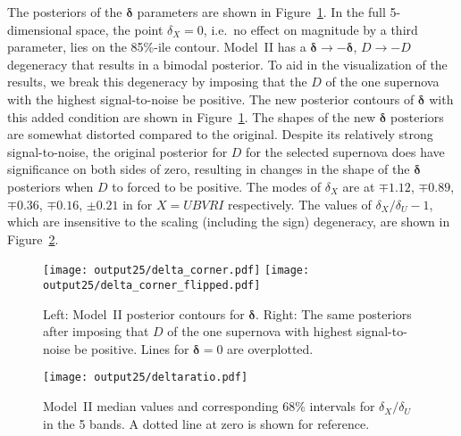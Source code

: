 \documentclass{aastex61}   	%
\begin{document}
\color{red}

The posteriors of the $\pmb{\delta}$ parameters are shown  in
Figure~\ref{deltacorner:fig}.
In the full 5-dimensional space,
the point $\delta_X=0$, i.e.\ no effect on magnitude by a third parameter,  lies on the 85\%-ile contour.
Model~II has a  $\pmb{\delta} \rightarrow -\pmb{\delta}$, $D \rightarrow -D$ degeneracy that results in a bimodal posterior.
To aid in the visualization of the results,
we break this degeneracy by imposing  that the $D$ of the one supernova with the highest signal-to-noise be positive.
The new posterior contours of $\pmb{\delta}$ with this added
condition are shown in Figure~\ref{deltacorner:fig}.
The shapes of the new $\pmb{\delta}$ posteriors are somewhat distorted compared to the original.
Despite its relatively strong signal-to-noise, the original posterior for $D$ for the selected supernova does have significance on both sides of zero,
resulting in changes in the shape of the $\pmb{\delta}$ posteriors when  $D$ to forced to be positive.   
The modes of $\delta_X$ are at $\mp 1.12$, $\mp 0.89$, $\mp 0.36$,  $\mp0.16$, $\pm0.21$ in for $X=UBVRI$ respectively.
The values of $\delta_X/\delta_U-1$, which are insensitive to the scaling (including the sign) degeneracy, are shown in Figure~\ref{deltaratio:fig}.

\begin{figure}[htbp] %
   \centering
   \texttt{[image: output25/delta\_corner.pdf]}
     \texttt{[image: output25/delta\_corner\_flipped.pdf]}
   \caption{Left:  Model~II posterior contours for $\pmb{\delta}$.
   Right: The same posteriors after imposing that $D$ of the one supernova with highest signal-to-noise be positive.
     Lines for $\pmb{\delta}=0$ are overplotted.
   \label{deltacorner:fig}}
\end{figure}


\begin{figure}[htbp] %
   \centering
      \texttt{[image: output25/deltaratio.pdf]}
   \caption{Model~II median values  and corresponding 68\% intervals for $\delta_X/\delta_U$ in the 5 bands.
   A dotted line at zero is shown for reference.
   \label{deltaratio:fig}}
\end{figure}

\color{black}


\end{document}
